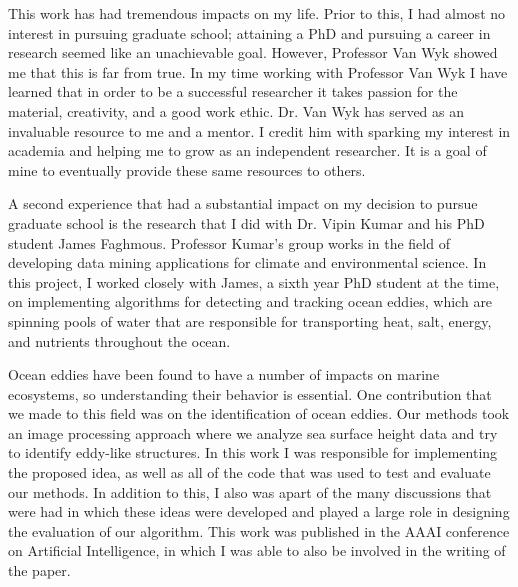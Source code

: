 \documentclass[12pt]{article}
\begin{document}
This work has had tremendous impacts on my life. Prior to this, I had almost no interest in pursuing graduate school; attaining a PhD and pursuing a career in research seemed like an unachievable goal. However, Professor Van Wyk showed me that this is far from true. In my time working with Professor Van Wyk I have learned that in order to be a successful researcher it takes passion for the material, creativity, and a good work ethic. Dr. Van Wyk has served as an invaluable resource to me and a mentor. I credit him with sparking my interest in academia and helping me to grow as an independent researcher. It is a goal of mine to eventually provide these same resources to others.

A second experience that had a substantial impact on my decision to pursue graduate school is the research that I did with Dr. Vipin Kumar and his PhD student James Faghmous. Professor Kumar's group works in the field of developing data mining applications for climate and environmental science. In this project, I worked closely with James, a sixth year PhD student at the time, on implementing algorithms for detecting and tracking ocean eddies, which are spinning pools of water that are responsible for transporting heat, salt, energy, and nutrients throughout the ocean.

Ocean eddies have been found to have a number of impacts on marine ecosystems, so understanding their behavior is essential. One contribution that we made to this field was on the identification of ocean eddies. Our methods took an image processing approach where we analyze sea surface height data and try to identify eddy-like structures.  In this work I was responsible for implementing the proposed idea, as well as all of the code that was used to test and evaluate our methods. In addition to this, I also was apart of the many discussions that were had in which these ideas were developed and played a large role in designing the evaluation of our algorithm. This work was published in the AAAI conference on Artificial Intelligence, in which I was able to also be involved in the writing of the paper.


\end{document}

